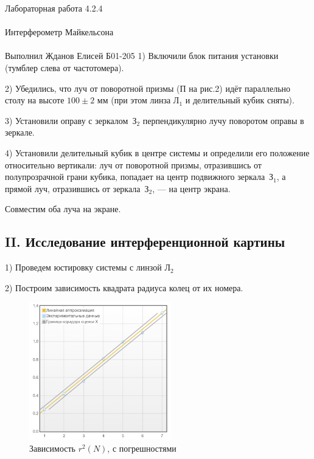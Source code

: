 \documentclass{astroedu-lab}
\begin{document}
\begin{problem}{\huge Лабораторная работа 4.2.4\\\\Интерферометр Майкельсона\\\\Выполнил Жданов Елисей Б01-205}
	 		1) Включили блок питания установки (тумблер слева от частотомера).
	 		
	 		2) Убедились, что луч от поворотной призмы (П на рис.2) идёт параллельно столу на высоте $100\pm2$ мм (при этом линза Л$_1$ и делительный кубик сняты).
	 		
	 		3) Установили оправу с зеркалом~З$_2$ перпендикулярно лучу поворотом оправы в зеркале.
	 		
	 		4) Установили делительный кубик в центре системы и определили его положение относительно вертикали: луч от поворотной призмы, отразившись от полупрозрачной грани кубика, попадает на центр подвижного зеркала~З$_1$, а прямой луч, отразившись от зеркала~З$_2$, --- на центр экрана.

Совместим оба луча на экране.

\subsection{II. Исследование интерференционной картины}

1) Проведем юстировку системы с линзой Л$_2$

2) Построим зависимость квадрата радиуса колец от их номера.

\newpage

\begin{figure}[h]
		\begin{center}
			\includegraphics[width = 0.55\textwidth]{гр1.png}
			\caption{Зависимость $r^2(N)$, с погрешностями}
		\end{center}
	\end{figure}


\end{problem}
\end{document}
